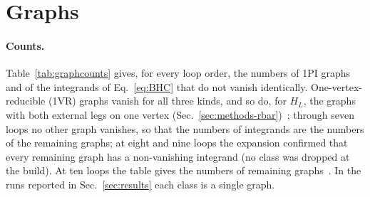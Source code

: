 \section{Graphs}
\label{app:graphs}

\paragraph{Counts.}
Table~\ref{tab:graphcounts} gives, for every loop order, the numbers of 1PI graphs and of the integrands of
Eq.~\eqref{eq:BHC} that do not vanish identically. One-vertex-reducible (1VR)
graphs vanish for all three kinds, and so do, for $H_L$, the graphs with both external legs on one vertex
(Sec.~\ref{sec:methods-rbar})~; through seven loops no other graph vanishes, so that the numbers of integrands are the
numbers of the remaining graphs; at eight and nine loops the expansion confirmed that every remaining graph has a
non-vanishing integrand (no class was dropped at the build). At ten loops the table gives the numbers of remaining
graphs~. In the runs reported in Sec.~\ref{sec:results} each class is a single graph.

